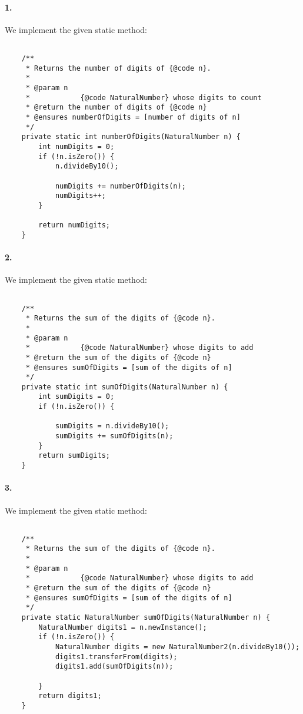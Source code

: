 \documentclass[10pt]{article}
\begin{document}
\maketitle

\paragraph{1. } We implement the given static method: 
\begin{lstlisting} 

    /**
     * Returns the number of digits of {@code n}.
     *
     * @param n
     *            {@code NaturalNumber} whose digits to count
     * @return the number of digits of {@code n}
     * @ensures numberOfDigits = [number of digits of n]
     */
    private static int numberOfDigits(NaturalNumber n) {
        int numDigits = 0;
        if (!n.isZero()) {
            n.divideBy10();

            numDigits += numberOfDigits(n);
            numDigits++;
        }

        return numDigits;
    }

\end{lstlisting}

\paragraph{2. } We implement the given static method: 
\begin{lstlisting} 

    /**
     * Returns the sum of the digits of {@code n}.
     *
     * @param n
     *            {@code NaturalNumber} whose digits to add
     * @return the sum of the digits of {@code n}
     * @ensures sumOfDigits = [sum of the digits of n]
     */
    private static int sumOfDigits(NaturalNumber n) {
        int sumDigits = 0;
        if (!n.isZero()) {

            sumDigits = n.divideBy10();
            sumDigits += sumOfDigits(n);
        }
        return sumDigits;
    }

\end{lstlisting}

\paragraph{3. } We implement the given static method: 
\begin{lstlisting} 

    /**
     * Returns the sum of the digits of {@code n}.
     *
     * @param n
     *            {@code NaturalNumber} whose digits to add
     * @return the sum of the digits of {@code n}
     * @ensures sumOfDigits = [sum of the digits of n]
     */
    private static NaturalNumber sumOfDigits(NaturalNumber n) {
        NaturalNumber digits1 = n.newInstance();
        if (!n.isZero()) {
            NaturalNumber digits = new NaturalNumber2(n.divideBy10());
            digits1.transferFrom(digits);
            digits1.add(sumOfDigits(n));

        }
        return digits1;
    }

\end{lstlisting}
\end{document}

